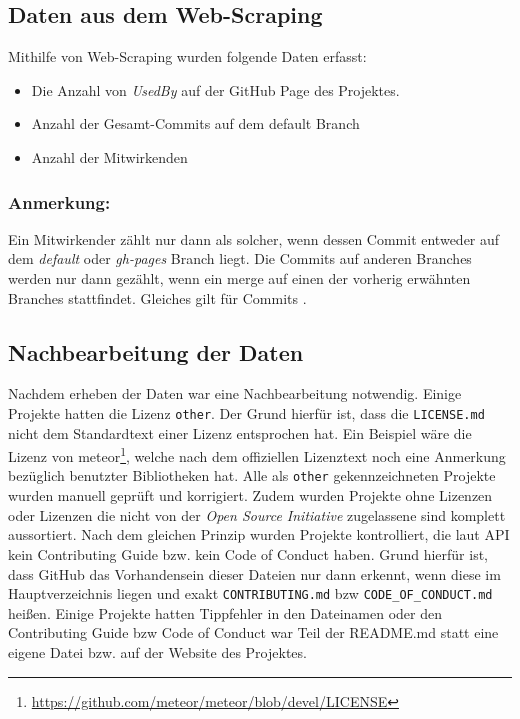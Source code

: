 
\subsection{Daten aus dem Web-Scraping}
Mithilfe von Web-Scraping wurden folgende Daten erfasst:

\begin{itemize}[noitemsep]
    \item Die Anzahl von \textit{UsedBy} auf der GitHub Page des Projektes.
    \item Anzahl der Gesamt-Commits auf dem default Branch
    \item Anzahl der Mitwirkenden
\end{itemize}

\subsubsection*{Anmerkung:}
Ein Mitwirkender zählt nur dann als solcher, wenn dessen Commit entweder auf dem \textit{default}
oder \textit{gh-pages} Branch liegt. Die Commits auf anderen Branches werden nur dann gezählt,
wenn ein merge auf einen der vorherig erwähnten Branches stattfindet. Gleiches gilt für Commits \cite{GHapiDocsCommits}.



\subsection{Nachbearbeitung der Daten}

Nachdem erheben der Daten war eine Nachbearbeitung notwendig. Einige Projekte hatten die Lizenz
\texttt{other}. Der Grund hierfür ist, dass die \texttt{LICENSE.md} nicht dem Standardtext einer
Lizenz entsprochen hat. Ein Beispiel wäre die Lizenz von
meteor\footnote{\url{https://github.com/meteor/meteor/blob/devel/LICENSE}},
welche nach dem offiziellen Lizenztext noch eine Anmerkung bezüglich benutzter Bibliotheken hat.
Alle als \texttt{other} gekennzeichneten Projekte wurden manuell geprüft und korrigiert.
%
Zudem wurden Projekte ohne Lizenzen oder Lizenzen die nicht von der \textit{Open Source Initiative}
zugelassene sind komplett aussortiert.
%
Nach dem gleichen Prinzip wurden Projekte kontrolliert, die laut API kein Contributing Guide bzw. kein Code
of Conduct haben. Grund hierfür ist, dass GitHub das Vorhandensein dieser Dateien nur dann erkennt,
wenn diese im Hauptverzeichnis liegen und exakt \texttt{CONTRIBUTING.md} bzw \texttt{CODE\_OF\_CONDUCT.md}
heißen. Einige Projekte hatten Tippfehler in den Dateinamen oder den Contributing Guide bzw Code of Conduct
war Teil der README.md statt eine eigene Datei bzw. auf der Website des Projektes.





